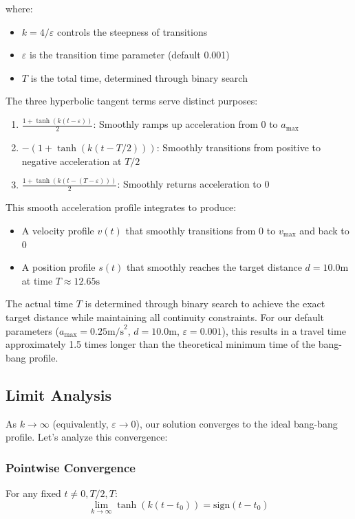 \documentclass[12pt,a4paper]{article}
\begin{document}
where:
\begin{itemize}
\item $k = 4/\varepsilon$ controls the steepness of transitions
\item $\varepsilon$ is the transition time parameter (default 0.001)
\item $T$ is the total time, determined through binary search
\end{itemize}

The three hyperbolic tangent terms serve distinct purposes:
\begin{enumerate}
\item $\frac{1 + \tanh(k(t - \varepsilon))}{2}$: Smoothly ramps up acceleration from 0 to $a_{\text{max}}$
\item $-(1 + \tanh(k(t - T/2)))$: Smoothly transitions from positive to negative acceleration at $T/2$
\item $\frac{1 + \tanh(k(t - (T-\varepsilon)))}{2}$: Smoothly returns acceleration to 0
\end{enumerate}

This smooth acceleration profile integrates to produce:
\begin{itemize}
\item A velocity profile $v(t)$ that smoothly transitions from 0 to $v_{\text{max}}$ and back to 0
\item A position profile $s(t)$ that smoothly reaches the target distance $d = 10.0\text{m}$ at time $T \approx 12.65\text{s}$
\end{itemize}

The actual time $T$ is determined through binary search to achieve the exact target distance while maintaining all continuity constraints. For our default parameters ($a_{\text{max}} = 0.25\text{m/s}^2$, $d = 10.0\text{m}$, $\varepsilon = 0.001$), this results in a travel time approximately 1.5 times longer than the theoretical minimum time of the bang-bang profile.

\subsection{Limit Analysis}
As $k \to \infty$ (equivalently, $\varepsilon \to 0$), our solution converges to the ideal bang-bang profile. Let's analyze this convergence:

\subsubsection{Pointwise Convergence}
For any fixed $t \neq 0, T/2, T$:
\begin{equation}
\lim_{k \to \infty} \tanh(k(t-t_0)) = \text{sign}(t-t_0)
\end{equation}
\end{document}

